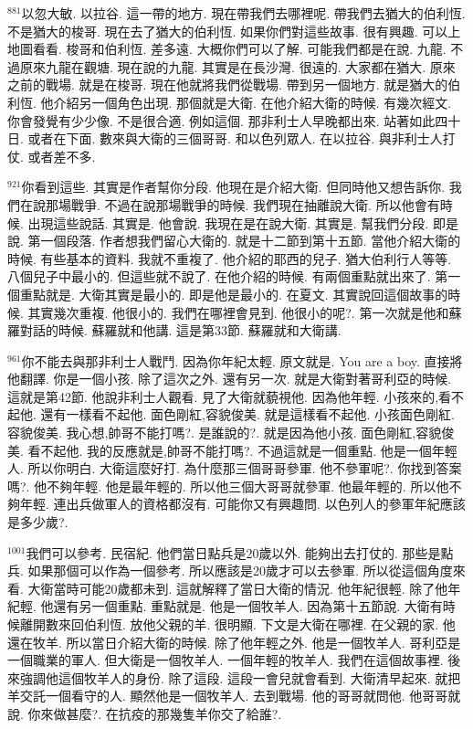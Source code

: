 \documentclass{book}
\begin{document}
$^{881}$以忽大敏.
以拉谷.
這一帶的地方.
現在帶我們去哪裡呢.
帶我們去猶大的伯利恆.
不是猶大的梭哥.
現在去了猶大的伯利恆.
如果你們對這些故事.
很有興趣.
可以上地圖看看.
梭哥和伯利恆.
差多遠.
大概你們可以了解.
可能我們都是在說.
九龍.
不過原來九龍在觀塘.
現在說的九龍.
其實是在長沙灣.
很遠的.
大家都在猶大.
原來之前的戰場.
就是在梭哥.
現在他就將我們從戰場.
帶到另一個地方.
就是猶大的伯利恆.
他介紹另一個角色出現.
那個就是大衛.
在他介紹大衛的時候.
有幾次經文.
你會發覺有少少像.
不是很合適.
例如這個.
那非利士人早晚都出來.
站著如此四十日.
或者在下面.
數來與大衛的三個哥哥.
和以色列眾人.
在以拉谷.
與非利士人打仗.
或者差不多.

$^{921}$你看到這些.
其實是作者幫你分段.
他現在是介紹大衛.
但同時他又想告訴你.
我們在說那場戰爭.
不過在說那場戰爭的時候.
我們現在抽離說大衛.
所以他會有時候.
出現這些說話.
其實是.
他會說.
我現在是在說大衛.
其實是.
幫我們分段.
即是說.
第一個段落.
作者想我們留心大衛的.
就是十二節到第十五節.
當他介紹大衛的時候.
有些基本的資料.
我就不重複了.
他介紹的耶西的兒子.
猶大伯利行人等等.
八個兒子中最小的.
但這些就不說了.
在他介紹的時候.
有兩個重點就出來了.
第一個重點就是.
大衛其實是最小的.
即是他是最小的.
在夏文.
其實說回這個故事的時候.
其實幾次重複.
他很小的.
我們在哪裡會見到.
他很小的呢?.
第一次就是他和蘇羅對話的時候.
蘇羅就和他講.
這是第33節.
蘇羅就和大衛講.

$^{961}$你不能去與那非利士人戰鬥.
因為你年紀太輕.
原文就是.
You are a boy.
直接將他翻譯.
你是一個小孩.
除了這次之外.
還有另一次.
就是大衛對著哥利亞的時候.
這就是第42節.
他說非利士人觀看.
見了大衛就藐視他.
因為他年輕.
小孩來的,看不起他.
還有一樣看不起他.
面色剛紅,容貌俊美.
就是這樣看不起他.
小孩面色剛紅.
容貌俊美.
我心想,帥哥不能打嗎?.
是誰說的?.
就是因為他小孩.
面色剛紅,容貌俊美.
看不起他.
我的反應就是,帥哥不能打嗎?.
不過這就是一個重點.
他是一個年輕人.
所以你明白.
大衛這麼好打.
為什麼那三個哥哥參軍.
他不參軍呢?.
你找到答案嗎?.
他不夠年輕.
他是最年輕的.
所以他三個大哥哥就參軍.
他最年輕的.
所以他不夠年輕.
連出兵做軍人的資格都沒有.
可能你又有興趣問.
以色列人的參軍年紀應該是多少歲?.

$^{1001}$我們可以參考.
民宿紀.
他們當日點兵是20歲以外.
能夠出去打仗的.
那些是點兵.
如果那個可以作為一個參考.
所以應該是20歲才可以去參軍.
所以從這個角度來看.
大衛當時可能20歲都未到.
這就解釋了當日大衛的情況.
他年紀很輕.
除了他年紀輕.
他還有另一個重點.
重點就是.
他是一個牧羊人.
因為第十五節說.
大衛有時候離開數來回伯利恆.
放他父親的羊.
很明顯.
下文是大衛在哪裡.
在父親的家.
他還在牧羊.
所以當日介紹大衛的時候.
除了他年輕之外.
他是一個牧羊人.
哥利亞是一個職業的軍人.
但大衛是一個牧羊人.
一個年輕的牧羊人.
我們在這個故事裡.
後來強調他這個牧羊人的身份.
除了這段.
這段一會兒就會看到.
大衛清早起來.
就把羊交託一個看守的人.
顯然他是一個牧羊人.
去到戰場.
他的哥哥就問他.
他哥哥就說.
你來做甚麼?.
在抗疫的那幾隻羊你交了給誰?.
\end{document}
